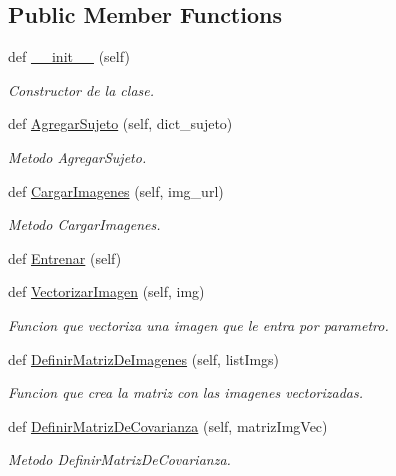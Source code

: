 \subsection*{Public Member Functions}
\begin{DoxyCompactItemize}
\item 
def \hyperlink{class_controller_1_1_controlador_1_1_controlador_ad30f895c86fb2085fbd3b2c0a1c9f38c}{\+\_\+\+\_\+init\+\_\+\+\_\+} (self)
\begin{DoxyCompactList}\small\item\em Constructor de la clase. \end{DoxyCompactList}\item 
def \hyperlink{class_controller_1_1_controlador_1_1_controlador_a9db63a2076f02aafddb2fb72a61630a2}{Agregar\+Sujeto} (self, dict\+\_\+sujeto)
\begin{DoxyCompactList}\small\item\em Metodo Agregar\+Sujeto. \end{DoxyCompactList}\item 
def \hyperlink{class_controller_1_1_controlador_1_1_controlador_a3284b7c2a5b4cb0f5e38231c6b0fb4b8}{Cargar\+Imagenes} (self, img\+\_\+url)
\begin{DoxyCompactList}\small\item\em Metodo Cargar\+Imagenes. \end{DoxyCompactList}\item 
def \hyperlink{class_controller_1_1_controlador_1_1_controlador_a56a3aa79738967e327fe35a017f72c24}{Entrenar} (self)
\item 
def \hyperlink{class_controller_1_1_controlador_1_1_controlador_a4bbeb1232cf73c6c9113e7ffda714b63}{Vectorizar\+Imagen} (self, img)
\begin{DoxyCompactList}\small\item\em Funcion que vectoriza una imagen que le entra por parametro. \end{DoxyCompactList}\item 
def \hyperlink{class_controller_1_1_controlador_1_1_controlador_a88254f919a6b1d7ed25e2f54b528a15c}{Definir\+Matriz\+De\+Imagenes} (self, list\+Imgs)
\begin{DoxyCompactList}\small\item\em Funcion que crea la matriz con las imagenes vectorizadas. \end{DoxyCompactList}\item 
def \hyperlink{class_controller_1_1_controlador_1_1_controlador_a4c342a4b7f56c2f8a566cdf62030816c}{Definir\+Matriz\+De\+Covarianza} (self, matriz\+Img\+Vec)
\begin{DoxyCompactList}\small\item\em Metodo Definir\+Matriz\+De\+Covarianza. \end{DoxyCompactList}\end{DoxyCompactItemize}
